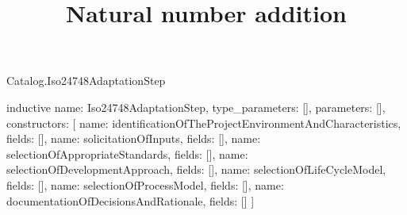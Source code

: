 \begin{lexlean}{Catalog.Iso24748AdaptationStep}
\title{Natural number addition}
\begin{semanticmodule}
inductive{
  name: Iso24748AdaptationStep,
  type_parameters: [],
  parameters: [],
  constructors: [
    {name: identificationOfTheProjectEnvironmentAndCharacteristics, fields: []},
    {name: solicitationOfInputs, fields: []},
    {name: selectionOfAppropriateStandards, fields: []},
    {name: selectionOfDevelopmentApproach, fields: []},
    {name: selectionOfLifeCycleModel, fields: []},
    {name: selectionOfProcessModel, fields: []},
    {name: documentationOfDecisionsAndRationale, fields: []}
  ]
}
\end{semanticmodule}
\end{lexlean}
